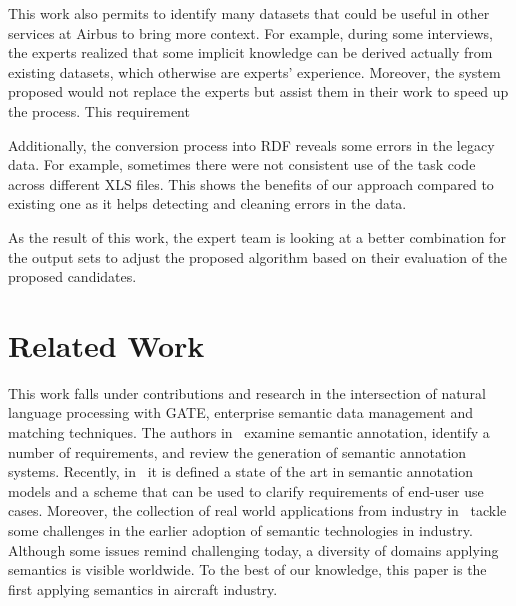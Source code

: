 \documentclass[runningheads,a4paper]{{llncs}}
\begin{document}
This work also permits to identify many datasets that could be useful in other services at Airbus to bring more context. For example, during some interviews, the experts realized that some implicit knowledge can be derived actually from existing datasets, which otherwise are experts' experience. Moreover, the system proposed would not replace the experts but assist them in their work to speed up the process. This requirement 

Additionally, the conversion process into RDF reveals some errors in the legacy data. For example, sometimes there were not consistent use of the task code across different XLS files. This shows the benefits of our approach compared to existing one as it helps detecting and cleaning errors in the data.    

As the result of this work, the expert team is looking at a better combination for the output sets to adjust the proposed algorithm based on their evaluation of the proposed candidates. 
  


\section{Related Work}
\label{sec:soa}

This work falls under contributions and research in the intersection of natural language processing with GATE, enterprise semantic data management and matching techniques. The authors in~\cite{Uren200614} examine semantic annotation, identify a number of requirements, and review the generation of semantic annotation systems. 
Recently, in~\cite{andrews2012} it is defined a state of the art in semantic annotation models and a scheme that can be used to clarify requirements of end-user use cases. Moreover, the collection of real world applications from industry in~\cite{cardoso2007} tackle some challenges in the earlier adoption of semantic technologies in industry. Although some issues remind challenging today, a diversity of domains applying semantics is visible worldwide. To the best of our knowledge, this paper is the first applying semantics in aircraft industry.  



\end{document}
